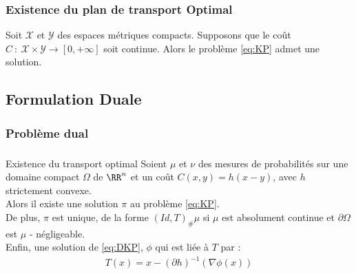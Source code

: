 \documentclass{beamer}
\begin{document}
  \begin{frame}\frametitle{Existence du plan de transport Optimal}
  	\begin{theoreme}{}
Soit $\mathcal{X}$ et $\mathcal{Y}$ des espaces métriques compacts. Supposons que le coût $C\ :\ \mathcal{X}\times\mathcal{Y}\rightarrow [0,+\infty]$ soit continue. Alors le problème \eqref{eq:KP} admet une solution.
\end{theoreme}
  \end{frame}
  
  
  \subsection{Formulation Duale}
  
  \begin{frame}\frametitle{Problème dual}
  \end{frame}
  
  
  \begin{frame}\frametitle{}
  \begin{theoreme}{Existence du transport optimal}
\label{thm:existtrasp}
Soient $\mu$ et $\nu$ des mesures de probabilités sur une domaine compact $\Omega$ de $\RR^n$ et un coût $C(x,y) = h(x-y)$, avec $h$ strictement convexe.\\ 
Alors il existe une solution $\pi$ au problème \eqref{eq:KP}. \\
De plus, $\pi$ est unique, de la forme $(Id,T)_{\#}\mu$ si $\mu$ est absolument continue et $\partial\Omega$ est $\mu$ - négligeable.\\
Enfin, une solution de \eqref{eq:DKP}, $\phi$ qui est liée à $T$ par :
\begin{align}
T(x) = x- (\partial h)^{-1}(\nabla\phi(x))
\end{align}
\end{theoreme}
  \end{frame}
  
\end{document}
